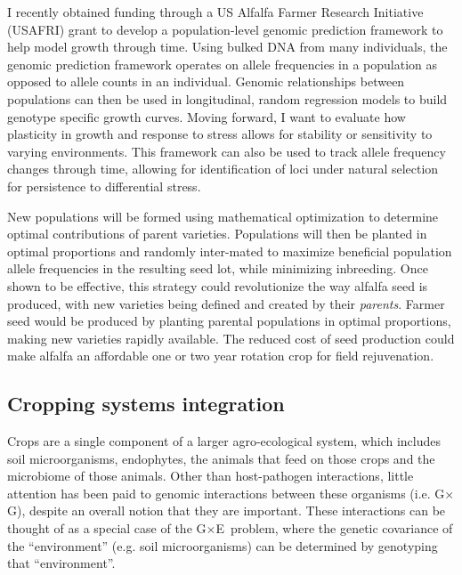 \documentclass[11pt]{article}
\newcommand{\gxe}{G$\times$E}
\newcommand{\gxg}{G$\times$G}
\begin{document}
I recently obtained funding through a US Alfalfa Farmer Research Initiative (USAFRI) grant to develop a population-level genomic prediction framework to help model growth through time. Using bulked DNA from many individuals, the genomic prediction framework operates on allele frequencies in a population as opposed to allele counts in an individual. Genomic relationships between populations can then be used in longitudinal, random regression models to build genotype specific growth curves. Moving forward, I want to evaluate how plasticity in growth and response to stress allows for stability or sensitivity to varying environments. This framework can also be used to track allele frequency changes through time, allowing for identification of loci under natural selection for persistence to differential stress.%


New populations will be formed using mathematical optimization to determine optimal contributions of parent varieties. Populations will then be planted in optimal proportions and randomly inter-mated to maximize beneficial population allele frequencies in the resulting seed lot, while minimizing inbreeding. Once shown to be effective, this strategy could revolutionize the way alfalfa seed is produced, with new varieties being defined and created by their \emph{parents}. Farmer seed would be produced by planting parental populations in optimal proportions, making new varieties rapidly available. The reduced cost of seed production could make alfalfa an affordable one or two year rotation crop for field rejuvenation.


\subsection*{Cropping systems integration}

Crops are a single component of a larger agro-ecological system, which includes soil microorganisms, endophytes, the animals that feed on those crops and the microbiome of those animals. Other than host-pathogen interactions, little attention has been paid to genomic interactions between these organisms (i.e. \gxg), despite an overall notion that they are important. These interactions can be thought of as a special case of the \gxe\ problem, where the genetic covariance of the ``environment'' (e.g. soil microorganisms) can be determined by genotyping that ``environment''. 
\end{document}
